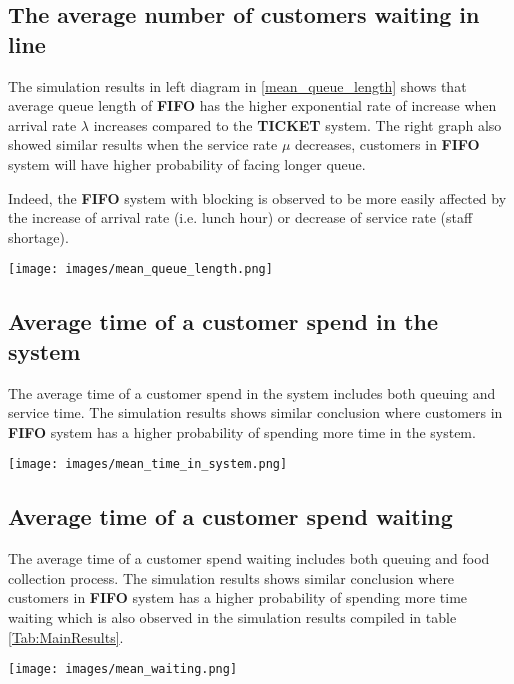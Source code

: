 \subsection{The average number of customers waiting in line}

The simulation results in left diagram in \ref{mean_queue_length} shows that average queue length of \textbf{FIFO} has the higher exponential rate of increase when arrival rate $\lambda$ increases compared to the \textbf{TICKET} system. The right graph also showed similar results when the service rate $\mu$ decreases, customers in \textbf{FIFO} system will have higher probability of facing longer queue. 

Indeed, the \textbf{FIFO} system with blocking is observed to be more easily affected by the increase of arrival rate (i.e. lunch hour) or decrease of service rate (staff shortage).

\noindent
\begin{minipage}{\textwidth}
    \texttt{[image: images/mean\_queue\_length.png]}
    \label{mean_queue_length}
\end{minipage}



\subsection{Average time of a customer spend in the system}

The average time of a customer spend in the system includes both queuing and service time. The simulation results shows similar conclusion where customers in  \textbf{FIFO} system has a higher probability of spending more time in the system.

\noindent
\begin{minipage}{\textwidth}
    \texttt{[image: images/mean\_time\_in\_system.png]}
    \label{bar}
\end{minipage}
\subsection{Average time of a customer spend waiting}

The average time of a customer spend waiting includes both queuing and food collection process. The simulation results shows similar conclusion where customers in  \textbf{FIFO} system has a higher probability of spending more time waiting which is also observed in the simulation results compiled in table \ref{Tab:MainResults}.

\noindent
\begin{minipage}{\textwidth}
    \texttt{[image: images/mean\_waiting.png]}
    \label{bar}
\end{minipage}
